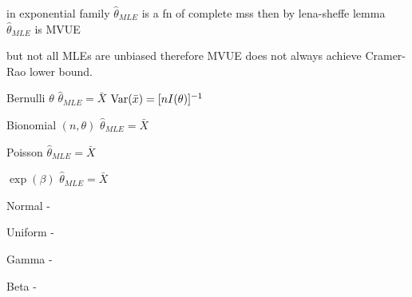  in exponential family $\hat\theta_{MLE}$ is a fn of  complete mss then by
lena-sheffe lemma $\hat\theta_{MLE}$ is MVUE

but not all MLEs are unbiased
therefore MVUE does not always achieve Cramer-Rao lower bound.




Bernulli $\theta$ $\hat\theta_{MLE}=\bar X$ $\mathrm{Var}(\bar x)=[nI(\theta)]^{-1}$

Bionomial $(n, \theta)$ $\hat\theta_{MLE}=\bar X$

Poisson $\hat\theta_{MLE}=\bar X$

$\exp(\beta)$ $\hat\theta_{MLE}=\bar X$

Normal - 

Uniform - 

Gamma - 

Beta - 
